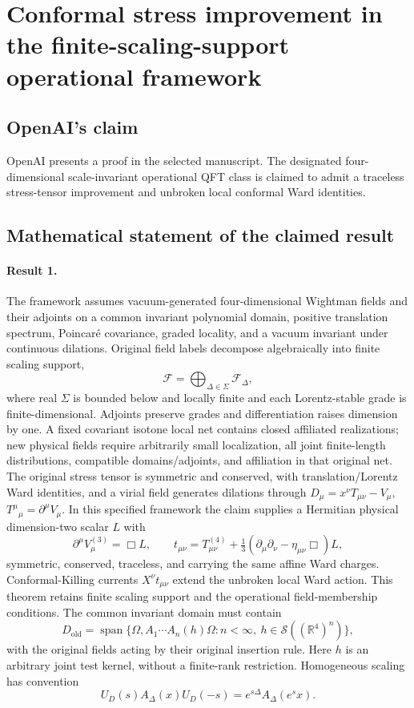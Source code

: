 \documentclass[11pt]{article}
\begin{document}
\section*{Conformal stress improvement in the finite-scaling-support operational framework}

\subsection{OpenAI's claim}
OpenAI presents a proof in the selected manuscript. The designated four-dimensional scale-invariant operational QFT class is claimed to admit a traceless stress-tensor improvement and unbroken local conformal Ward identities.

\subsection{Mathematical statement of the claimed result}
\paragraph{Result 1.} The framework assumes vacuum-generated four-dimensional Wightman fields and their adjoints on a common invariant polynomial domain, positive translation spectrum, Poincar\'e covariance, graded locality, and a vacuum invariant under continuous dilations. Original field labels decompose algebraically into finite scaling support,
\[
 \mathcal F=\bigoplus_{\Delta\in\Sigma}\mathcal F_\Delta,
\]
where real \(\Sigma\) is bounded below and locally finite and each Lorentz-stable grade is finite-dimensional. Adjoints preserve grades and differentiation raises dimension by one. A fixed covariant isotone local net contains closed affiliated realizations; new physical fields require arbitrarily small localization, all joint finite-length distributions, compatible domains/adjoints, and affiliation in that original net. The original stress tensor is symmetric and conserved, with translation/Lorentz Ward identities, and a virial field generates dilations through \(D_\mu=x^\nu T_{\mu\nu}-V_\mu\), \(T^\mu{}_{\mu}=\partial^\mu V_\mu\). In this specified framework the claim supplies a Hermitian physical dimension-two scalar \(L\) with
\[
 \partial^\mu V^{(3)}_\mu=\Box L,\qquad
 t_{\mu\nu}=T^{(4)}_{\mu\nu}
 +\tfrac13(\partial_\mu\partial_\nu-\eta_{\mu\nu}\Box)L,
\]
symmetric, conserved, traceless, and carrying the same affine Ward charges. Conformal-Killing currents \(X^\nu t_{\mu\nu}\) extend the unbroken local Ward action. This theorem retains finite scaling support and the operational field-membership conditions. The common invariant domain must contain
\[
 D_{\mathrm{old}}=\operatorname{span}\{\Omega,A_1\cdots A_n(h)\Omega:
 n<\infty,\ h\in\mathcal S((\mathbb R^4)^n)\},
\]
with the original fields acting by their original insertion rule. Here $h$ is an arbitrary joint test kernel, without a finite-rank restriction. Homogeneous scaling has convention
\[
 U_D(s)A_\Delta(x)U_D(-s)=e^{s\Delta}A_\Delta(e^s x).
\]
\end{document}
